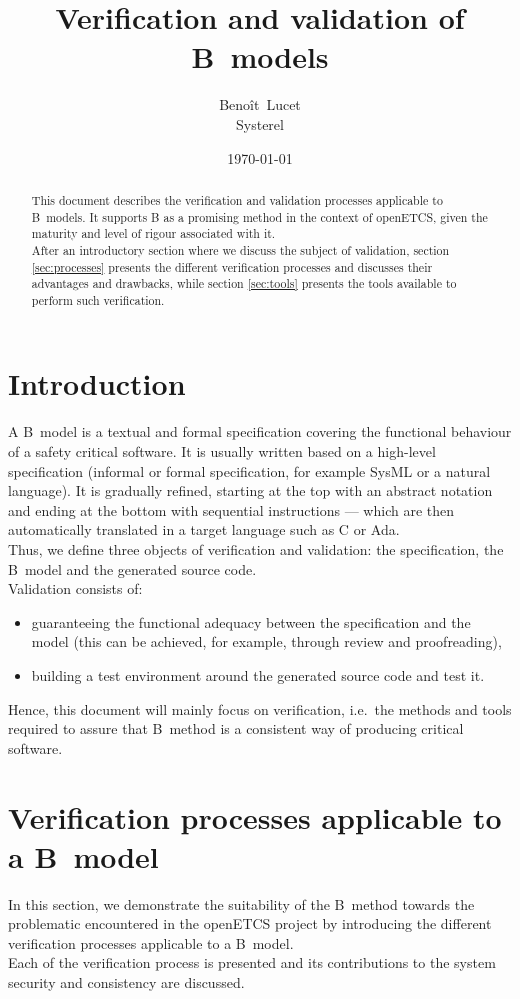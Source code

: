 \documentclass{article}
\title{Verification and validation of B~models}
\author{Benoît~Lucet\\Systerel}
\date{\today}
\begin{document}
\maketitle

\begin{abstract}
This document describes the verification and validation processes applicable to B~models. It supports B as a promising method in the context of openETCS, given the maturity and level of rigour associated with it.\\
After an introductory section where we discuss the subject of validation, section \ref{sec:processes} presents the different verification processes and discusses their advantages and drawbacks, while section \ref{sec:tools} presents the tools available to perform such verification.
\end{abstract}

\tableofcontents

\newpage

\section{Introduction}
\label{sec:intro}
A B~model is a textual and formal specification covering the functional behaviour of a safety critical software. It is usually written based on a high-level specification (informal or formal specification, for example SysML or a natural language). It is gradually refined, starting at the top with an abstract notation and ending at the bottom with sequential instructions --- which are then automatically translated in a target language such as C or Ada.\\
Thus, we define three objects of verification and validation: the specification, the B~model and the generated source code.\\

Validation consists of:
\begin{itemize}
\item guaranteeing the functional adequacy between the specification and the model (this can be achieved, for example, through review and proofreading),
\item building a test environment around the generated source code and test it.
\end{itemize}
Hence, this document will mainly focus on verification, i.e.\ the methods and tools required to assure that B~method is a consistent way of producing critical software.

\section{Verification processes applicable to a B~model}
\label{sec:processes}
In this section, we demonstrate the suitability of the B~method towards the problematic encountered in the openETCS project by introducing the different verification processes applicable to a B~model.\\
Each of the verification process is presented and its contributions to the system security and consistency are discussed.
\end{document}
